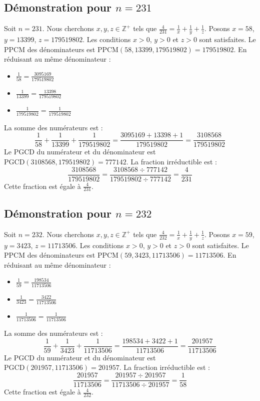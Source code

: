 \documentclass[11pt,a4paper]{article}
\begin{document}
\subsection{Démonstration pour $n = 231$}
Soit $n = 231$. Nous cherchons $x, y, z \in \mathbb{Z}^{+}$ tels que $\frac{4}{231} = \frac{1}{x} + \frac{1}{y} + \frac{1}{z}$.
Posons $x = 58$, $y = 13399$, $z = 179519802$.
Les conditions $x > 0$, $y > 0$ et $z > 0$ sont satisfaites.
Le PPCM des dénominateurs est $\text{PPCM}(58, 13399, 179519802) = 179519802$.
En réduisant au même dénominateur :
\begin{itemize}
    \item $\frac{1}{58} = \frac{3095169}{179519802}$
    \item $\frac{1}{13399} = \frac{13398}{179519802}$
    \item $\frac{1}{179519802} = \frac{1}{179519802}$
\end{itemize}
La somme des numérateurs est :
$$ \frac{1}{58} + \frac{1}{13399} + \frac{1}{179519802} = \frac{3095169 + 13398 + 1}{179519802} = \frac{3108568}{179519802} $$
Le PGCD du numérateur et du dénominateur est $\text{PGCD}(3108568, 179519802) = 777142$.
La fraction irréductible est :
$$ \frac{3108568}{179519802} = \frac{3108568 \div 777142}{179519802 \div 777142} = \frac{4}{231} $$
Cette fraction est égale à $\frac{4}{231}$.

\subsection{Démonstration pour $n = 232$}
Soit $n = 232$. Nous cherchons $x, y, z \in \mathbb{Z}^{+}$ tels que $\frac{4}{232} = \frac{1}{x} + \frac{1}{y} + \frac{1}{z}$.
Posons $x = 59$, $y = 3423$, $z = 11713506$.
Les conditions $x > 0$, $y > 0$ et $z > 0$ sont satisfaites.
Le PPCM des dénominateurs est $\text{PPCM}(59, 3423, 11713506) = 11713506$.
En réduisant au même dénominateur :
\begin{itemize}
    \item $\frac{1}{59} = \frac{198534}{11713506}$
    \item $\frac{1}{3423} = \frac{3422}{11713506}$
    \item $\frac{1}{11713506} = \frac{1}{11713506}$
\end{itemize}
La somme des numérateurs est :
$$ \frac{1}{59} + \frac{1}{3423} + \frac{1}{11713506} = \frac{198534 + 3422 + 1}{11713506} = \frac{201957}{11713506} $$
Le PGCD du numérateur et du dénominateur est $\text{PGCD}(201957, 11713506) = 201957$.
La fraction irréductible est :
$$ \frac{201957}{11713506} = \frac{201957 \div 201957}{11713506 \div 201957} = \frac{1}{58} $$
Cette fraction est égale à $\frac{4}{232}$.
\end{document}
